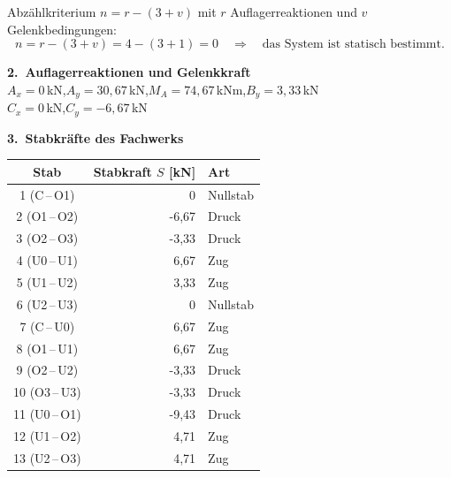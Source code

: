 \documentclass[a4paper,11pt]{article}
\begin{document}
Abz\"ahlkriterium $n = r - (3 + v)$ mit $r$ Auflagerreaktionen und $v$ Gelenkbedingungen:
\[ n = r - (3+v) = 4 - (3+1) = 0 \quad\Rightarrow\quad \text{das System ist statisch bestimmt.} \]
\par\medskip\textbf{2.\ Auflagerreaktionen und Gelenkkraft}\\[-2pt]
$A_x = 0$\,kN,\quad $A_y = 30,67$\,kN,\quad $M_A = 74,67$\,kNm,\quad $B_y = 3,33$\,kN\\[2pt]$C_x = 0$\,kN,\quad $C_y = -6,67$\,kN\par
\par\medskip\textbf{3.\ Stabkr\"afte des Fachwerks}\par
\begin{center}\renewcommand{\arraystretch}{1.15}
\begin{tabular}{c r l}
\toprule
Stab & Stabkraft $S$ [kN] & Art \\
\midrule
  1 (C\,--\,O1) & 0 & Nullstab \\
  2 (O1\,--\,O2) & -6,67 & Druck \\
  3 (O2\,--\,O3) & -3,33 & Druck \\
  4 (U0\,--\,U1) & 6,67 & Zug \\
  5 (U1\,--\,U2) & 3,33 & Zug \\
  6 (U2\,--\,U3) & 0 & Nullstab \\
  7 (C\,--\,U0) & 6,67 & Zug \\
  8 (O1\,--\,U1) & 6,67 & Zug \\
  9 (O2\,--\,U2) & -3,33 & Druck \\
  10 (O3\,--\,U3) & -3,33 & Druck \\
  11 (U0\,--\,O1) & -9,43 & Druck \\
  12 (U1\,--\,O2) & 4,71 & Zug \\
  13 (U2\,--\,O3) & 4,71 & Zug \\
\bottomrule
\end{tabular}\end{center}
\end{document}
